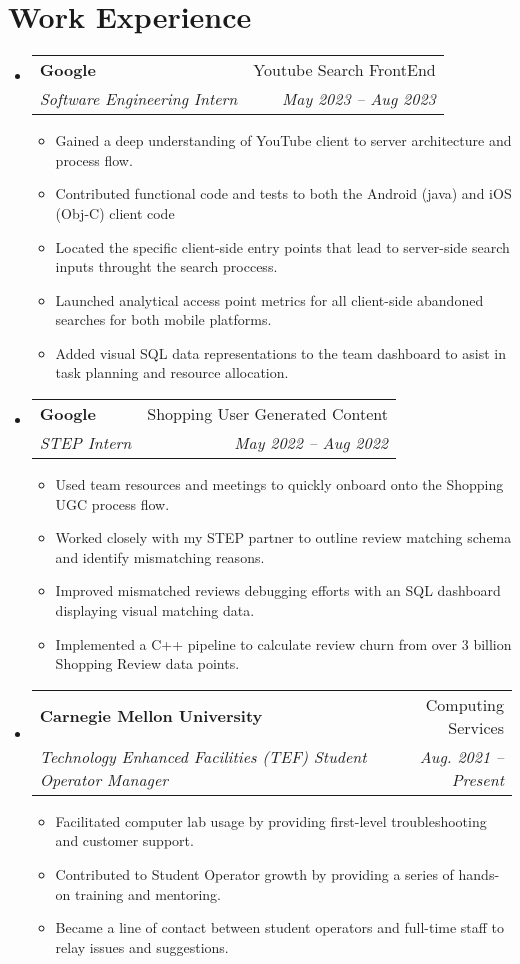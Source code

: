 \documentclass[letterpaper,11pt]{article}
\makeatletter
\newcommand{\resumeItem}[1]{
  \item\small{
    {#1 \vspace{-2pt}}
  }
}
\newcommand{\resumeSubheading}[4]{
  \vspace{-2pt}\item
    \begin{tabular*}{0.97\textwidth}[t]{l@{\extracolsep{\fill}}r}
      \textbf{#1} & #2 \\
      \textit{\small#3} & \textit{\small #4} \\
    \end{tabular*}\vspace{-7pt}
}
\newcommand{\resumeSubHeadingListStart}{\begin{itemize}[leftmargin=0.15in, label={}]}
\newcommand{\resumeSubHeadingListEnd}{\end{itemize}}
\newcommand{\resumeItemListStart}{\begin{itemize}}
\newcommand{\resumeItemListEnd}{\end{itemize}\vspace{-5pt}}
\makeatother
\begin{document}
\section{Work Experience}
    \resumeSubHeadingListStart
        \resumeSubheading
        {Google}{Youtube Search FrontEnd}
        {Software Engineering Intern}{May 2023 -- Aug 2023}
            \resumeItemListStart
                \resumeItem{Gained a deep understanding of YouTube client to server architecture and process flow.}
                \resumeItem{Contributed functional code and tests to both the Android (java) and iOS (Obj-C) client code}
                \resumeItem{Located the specific client-side entry points that lead to server-side search inputs throught the search proccess.}
                \resumeItem{Launched analytical access point metrics for all client-side abandoned searches for both mobile platforms.}
                \resumeItem{Added visual SQL data representations to the team dashboard to asist in task planning and resource allocation.}
            \resumeItemListEnd
        \resumeSubheading
        {Google}{Shopping User Generated Content}
        {STEP Intern}{May 2022 -- Aug 2022}
            \resumeItemListStart
                \resumeItem{Used team resources and meetings to quickly onboard onto the Shopping UGC process flow.}
                \resumeItem{Worked closely with my STEP partner to outline review matching schema and identify mismatching reasons.}
                \resumeItem{Improved mismatched reviews debugging efforts with an SQL dashboard displaying visual matching data.}
                \resumeItem{Implemented a C++ pipeline to calculate review churn from over 3 billion Shopping Review data points.}
            \resumeItemListEnd
        \resumeSubheading
        {Carnegie Mellon University}{Computing Services}
        {Technology Enhanced Facilities (TEF) Student Operator Manager}{Aug. 2021 -- Present}
            \resumeItemListStart
                \resumeItem{Facilitated computer lab usage by providing first-level troubleshooting and customer support.}
                \resumeItem{Contributed to Student Operator growth by providing a series of hands-on training and mentoring.}
                \resumeItem{Became a line of contact between student operators and full-time staff to relay issues and suggestions.}
            \resumeItemListEnd
    \resumeSubHeadingListEnd

\end{document}
